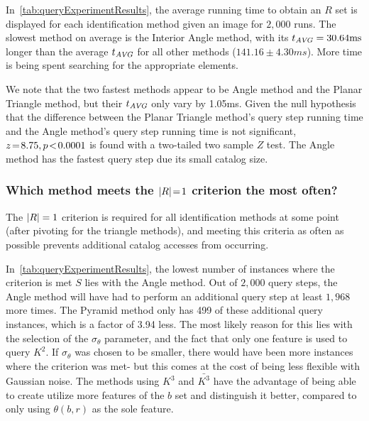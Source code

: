 In~\autoref{tab:queryExperimentResults}, the average running time to obtain an $R$ set is displayed for each
identification method given an image for $2{,}000$ runs.
The slowest method on average is the Interior Angle method, with its $t_{\AVG} = 30.64 \si{ms}$ longer than the average
$t_{\AVG}$ for all other methods ($141.16 \pm 4.30 \si{ms}$).
More time is being spent searching for the appropriate elements.

We note that the two fastest methods appear to be Angle method and the Planar Triangle method, but their $t_\AVG$ only
vary by 1.05ms.
Given the null hypothesis that the difference between the Planar Triangle method's query step running time and the
Angle method's query step running time is not significant, $z \seq 8.75, p\!<\!0.0001$ is found with a two-tailed two
sample $Z$ test.
The Angle method has the fastest query step due its small catalog size.

\subsubsection{Which method meets the $\abs{R} \seq 1$ criterion the most often?}
The $\abs{R} = 1$ criterion is required for all identification methods at some point (after pivoting for the triangle
methods), and meeting this criteria as often as possible prevents additional catalog accesses from occurring.

In~\autoref{tab:queryExperimentResults}, the lowest number of instances where the criterion is met $S$ lies with the
Angle method.
Out of $2{,}000$ query steps, the Angle method will have had to perform an additional query step at least
$1{,}968$ more times.
The Pyramid method only has 499 of these additional query instances, which is a factor of 3.94 less.
The most likely reason for this lies with the selection of the $\sigma_\theta$ parameter, and the fact that only one
feature is used to query $K^2$.
If $\sigma_\theta$ was chosen to be smaller, there would have been more instances where the criterion was met- but
this comes at the cost of being less flexible with Gaussian noise.
The methods using $K^3$ and $\bar{K^3}$ have the advantage of being able to create utilize more features of the $b$ set
and distinguish it better, compared to only using $\theta(b, r)$ as the sole feature.

